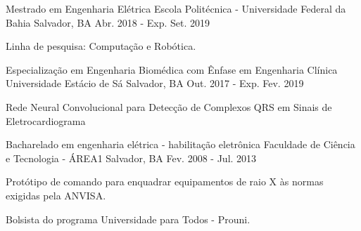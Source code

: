 

\begin{cventries}

  \cventry
    {Mestrado em Engenharia Elétrica} %
    {Escola Politécnica - Universidade Federal da Bahia} %
    {Salvador, BA} %
    {Abr. 2018 - Exp. Set. 2019} %
    {
      \begin{cvitems} %
        \item {Linha de pesquisa: Computação e Robótica.}
      \end{cvitems}
    }


  \cventry
    {Especialização em Engenharia Biomédica com Ênfase em Engenharia Clínica} %
    {Universidade Estácio de Sá} %
    {Salvador, BA} %
    {Out. 2017 - Exp. Fev. 2019} %
    {
      \begin{cvitems} %
        \item {Rede Neural Convolucional para Detecção de Complexos QRS em Sinais de Eletrocardiograma}
      \end{cvitems}
    }


  \cventry
    {Bacharelado em engenharia elétrica - habilitação eletrônica} %
    {Faculdade de Ciência e Tecnologia - ÁREA1} %
    {Salvador, BA} %
    {Fev. 2008 - Jul. 2013} %
    {
      \begin{cvitems} %
        \item {Protótipo de comando para enquadrar equipamentos de raio X às normas exigidas pela ANVISA.}
        \item {Bolsista do programa Universidade para Todos - Prouni.}
      \end{cvitems}
    }


\end{cventries}
